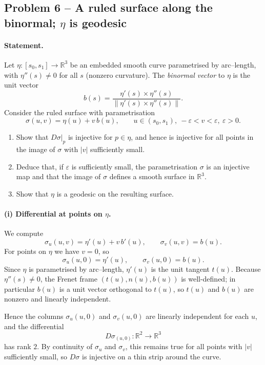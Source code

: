 \documentclass[12pt,a4paper]{article}
\theoremstyle{plain}
\theoremstyle{definition}      %
\begin{document}
	\bigskip
	\subsection*{Problem 6 – A ruled surface along the binormal; $\eta$ is geodesic}
	
	\paragraph{Statement.}
	Let $\eta:[s_0,s_1]\to\mathbb{R}^3$ be an embedded smooth curve parametrised by
	arc--length, with $\eta''(s)\neq0$ for all $s$ (nonzero curvature).
	The \emph{binormal vector} to $\eta$ is the unit vector
	\[
	b(s) = \frac{\eta'(s)\times\eta''(s)}{\|\eta'(s)\times\eta''(s)\|}.
	\]
	Consider the ruled surface with parametrisation
	\[
	\sigma(u,v)=\eta(u)+v\,b(u),\qquad
	u\in(s_0,s_1),\ -\varepsilon<v<\varepsilon,\ \varepsilon>0.
	\]
	\begin{enumerate}
		\item[(i)] Show that $D\sigma|_p$ is injective for $p\in\eta$, and hence is
		injective for all points in the image of $\sigma$ with $|v|$
		sufficiently small.
		\item[(ii)] Deduce that, if $\varepsilon$ is sufficiently small, the
		parametrisation $\sigma$ is an injective map and that the image of
		$\sigma$ defines a smooth surface in $\mathbb{R}^3$.
		\item[(iii)] Show that $\eta$ is a geodesic on the resulting surface.
	\end{enumerate}
	
	\paragraph{(i) Differential at points on $\eta$.}
	We compute
	\[
	\sigma_u(u,v) = \eta'(u)+v\,b'(u),\qquad
	\sigma_v(u,v) = b(u).
	\]
	For points on $\eta$ we have $v=0$, so
	\[
	\sigma_u(u,0)=\eta'(u),\qquad \sigma_v(u,0)=b(u).
	\]
	Since $\eta$ is parametrised by arc--length, $\eta'(u)$ is the unit tangent
	$t(u)$.  Because $\eta''(s)\neq0$, the Frenet frame $(t(u),n(u),b(u))$ is
	well-defined; in particular $b(u)$ is a unit vector orthogonal to $t(u)$, so
	$t(u)$ and $b(u)$ are nonzero and linearly independent.
	
	Hence the columns $\sigma_u(u,0)$ and $\sigma_v(u,0)$ are linearly independent
	for each $u$, and the differential
	\[
	D\sigma_{(u,0)}:\mathbb{R}^2\to\mathbb{R}^3
	\]
	has rank $2$.  By continuity of $\sigma_u$ and $\sigma_v$, this remains true
	for all points with $|v|$ sufficiently small, so $D\sigma$ is injective on a
	thin strip around the curve.
	
\end{document}
